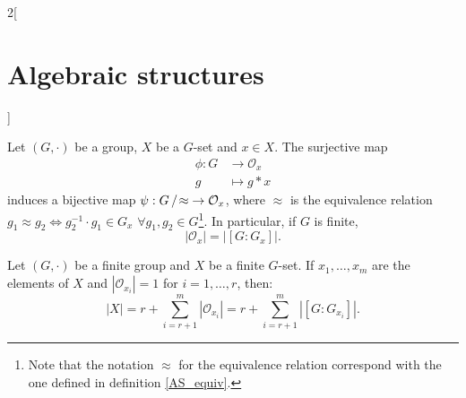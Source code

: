 \documentclass[class=article,10pt,crop=false]{standalone}
\begin{document}
\begin{multicols}{2}[\section{Algebraic structures}]
\begin{prop}
\end{prop}
\begin{theorem}
Let $(G,\cdot)$ be a group, $X$ be a $G$-set and $x\in X$. The surjective map
\begin{align*}
    \phi:G&\longrightarrow \mathcal{O}_x\\
    g&\longmapsto g*x
\end{align*}
induces a bijective map $\psi:\quot{G}{\!\!\approx}\;\rightarrow\mathcal{O}_x$, where $\approx$ is the equivalence relation $g_1\approx g_2\iff g_2^{-1}\cdot g_1\in G_x$ $\forall g_1,g_2\in G$\footnote{Note that the notation $\approx$ for the equivalence relation correspond with the one defined in definition \ref{AS_equiv}.}. In particular, if $G$ is finite, $$|\mathcal{O}_x|=|[G:G_x]|.$$
\end{theorem}
\begin{corollary}
Let $(G,\cdot)$ be a finite group and $X$ be a finite $G$-set. If $x_1,\ldots,x_m$ are the elements of $X$ and $|\mathcal{O}_{x_i}|=1$ for $i=1,\ldots,r$, then:
\begin{equation}
    |X|=r+\sum_{i=r+1}^m|\mathcal{O}_{x_i}|=r+\sum_{i=r+1}^m|[G:G_{x_i}]|.
    \label{EA-obritsformula}
\end{equation}
\end{corollary}

\end{multicols}
\end{document}
